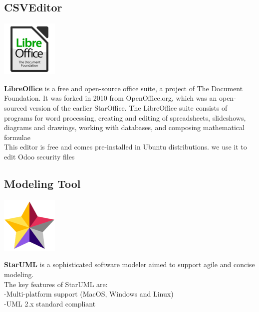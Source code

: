     
    \subsection*{CSVEditor}
  
          \begin{center}
          \includegraphics[scale=0.8]{img/LibreOffice102.png}\\
          \end{center}
    \textbf{LibreOffice} is a free and open-source office suite, a project of The Document Foundation. It was forked in 2010 from OpenOffice.org, which was an open-sourced version of the earlier StarOffice. The LibreOffice suite consists of programs for word processing, creating and editing of spreadsheets, slideshows, diagrams and drawings, working with databases, and composing mathematical formulae\cite{LibreOffice}\\
    This editor is free and comes pre-installed in Ubuntu distributions. we use it to edit Odoo security files\\

    
    \subsection*{Modeling Tool}
          \begin{center}
          \includegraphics[scale=0.8]{img/StarUML102.png}
          \end{center}
    \textbf{StarUML} is a sophisticated software modeler aimed to support agile and concise modeling.\\
    The key features of StarUML are:\\
    -Multi-platform support (MacOS, Windows and Linux)\\
    -UML 2.x standard compliant\cite{StarUML}
    
    
    
    
    
